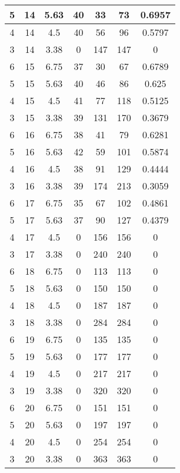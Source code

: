\documentclass[letterpaper, 12pt]{article}
\begin{document}
\begin{longtable}{|c|c|c|c|c|c|c|}
\hline
5 & 14 & 5.63 & 40 & 33 & 73 & 0.6957 \\
\hline
4 & 14 & 4.5 & 40 & 56 & 96 & 0.5797 \\
\hline
3 & 14 & 3.38 & 0 & 147 & 147 & 0 \\
\hline
6 & 15 & 6.75 & 37 & 30 & 67 & 0.6789 \\
\hline
5 & 15 & 5.63 & 40 & 46 & 86 & 0.625 \\
\hline
4 & 15 & 4.5 & 41 & 77 & 118 & 0.5125 \\
\hline
3 & 15 & 3.38 & 39 & 131 & 170 & 0.3679 \\
\hline
6 & 16 & 6.75 & 38 & 41 & 79 & 0.6281 \\
\hline
5 & 16 & 5.63 & 42 & 59 & 101 & 0.5874 \\
\hline
4 & 16 & 4.5 & 38 & 91 & 129 & 0.4444 \\
\hline
3 & 16 & 3.38 & 39 & 174 & 213 & 0.3059 \\
\hline
6 & 17 & 6.75 & 35 & 67 & 102 & 0.4861 \\
\hline
5 & 17 & 5.63 & 37 & 90 & 127 & 0.4379 \\
\hline
4 & 17 & 4.5 & 0 & 156 & 156 & 0 \\
\hline
3 & 17 & 3.38 & 0 & 240 & 240 & 0 \\
\hline
6 & 18 & 6.75 & 0 & 113 & 113 & 0 \\
\hline
5 & 18 & 5.63 & 0 & 150 & 150 & 0 \\
\hline
4 & 18 & 4.5 & 0 & 187 & 187 & 0 \\
\hline
3 & 18 & 3.38 & 0 & 284 & 284 & 0 \\
\hline
6 & 19 & 6.75 & 0 & 135 & 135 & 0 \\
\hline
5 & 19 & 5.63 & 0 & 177 & 177 & 0 \\
\hline
4 & 19 & 4.5 & 0 & 217 & 217 & 0 \\
\hline
3 & 19 & 3.38 & 0 & 320 & 320 & 0 \\
\hline
6 & 20 & 6.75 & 0 & 151 & 151 & 0 \\
\hline
5 & 20 & 5.63 & 0 & 197 & 197 & 0 \\
\hline
4 & 20 & 4.5 & 0 & 254 & 254 & 0 \\
\hline
3 & 20 & 3.38 & 0 & 363 & 363 & 0 \\
\hline
\end{longtable}
\end{document}

